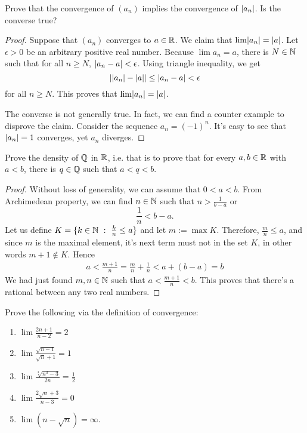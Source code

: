 \begin{exercise}
  Prove that the convergence of $(a_n)$ implies the convergence
  of $\lvert a_n\rvert$. Is the converse true?
\end{exercise}
\begin{proof}
  Suppose that $(a_n)$ converges to $a\in\R$. We claim that
  $\lim\lvert a_n\rvert=\lvert a\rvert$. Let $\epsilon>0$ be an arbitrary
  positive real number. Because $\lim a_n=a$, there is 
  $N\in\N$ such that for all $n\geq N$, $\lvert a_n-a\rvert<\epsilon$.
  Using triangle inequality, we get
  \[
    \lvert\lvert a_n\rvert-\lvert a\rvert\rvert\leq \lvert a_n-a\rvert<\epsilon
  \]
  for all $n\geq N$. This proves that $\lim\lvert a_n\rvert=\lvert a\rvert$.

  The converse is not generally true. In fact, we can find a counter
  example to disprove the claim. Consider the sequence $a_n=(-1)^n$.
  It's easy to see that $\lvert a_n\rvert=1$ converges, yet $a_n$
  diverges.
\end{proof}
\begin{exercise}
  Prove the density of $\Q$ in $\R$, i.e. that is to prove that
  for every $a,b\in\R$ with $a<b$, there is $q\in\Q$ such that
  $a<q<b$.
\end{exercise}
\begin{proof}
  Without loss of generality, we can assume that
  $0<a<b$. From Archimedean property, 
  we can find $n\in\N$ such that $n>\frac{1}{b-a}$ or
  \[\frac{1}{n}<b-a.\]
  Let us define $K=\{k\in\N~:~\frac{k}{n}\leq a\}$ and let $m:=\max K$. 
  Therefore, $\frac{m}{n}\leq a$, and since $m$ is the maximal element, 
  it's next term must not in the set $K$, in other words 
  $m+1\notin K$. Hence
  \begin{align*}
    a<\frac{m+1}{n}=\frac{m}{n}+\frac{1}{n}< a+(b-a)=b
  \end{align*}
  We had just found $m,n\in\N$ such that $a<\frac{m+1}{n}<b$.
  This proves that there's a rational between any two real numbers.
\end{proof}
\begin{exercise}
  Prove the following via the definition of convergence:
  \begin{enumerate}
    \item $\lim\frac{2n+1}{n-2}=2$
    \item $\lim\frac{\sqrt{n-1}}{\sqrt{n}+1}=1$
    \item $\lim\frac{\sqrt[3]{n^3-3}}{2n}=\frac{1}{2}$
    \item $\lim\frac{2\sqrt{n}+3}{n-3}=0$
    \item $\lim(n-\sqrt{n})=\infty$.
  \end{enumerate}
\end{exercise}
